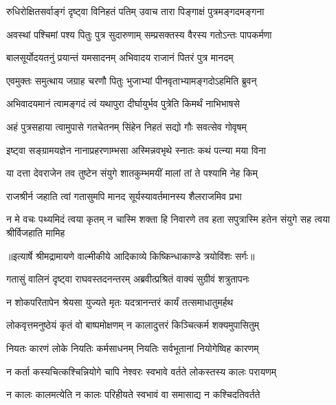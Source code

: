 \twolineshloka
{रुधिरोक्षितसर्वाङ्गं दृष्ट्वा विनिहतं पतिम्}
{उवाच तारा पिङ्गाक्षं पुत्रमङ्गदमङ्गना} %

\twolineshloka
{अवस्थां पश्चिमां पश्य पितुः पुत्र सुदारुणाम्}
{सम्प्रसक्तस्य वैरस्य गतोऽन्तः पापकर्मणा} %

\twolineshloka
{बालसूर्योदयतनुं प्रयान्तं यमसादनम्}
{अभिवादय राजानं पितरं पुत्र मानदम्} %

\twolineshloka
{एवमुक्तः समुत्थाय जग्राह चरणौ पितुः}
{भुजाभ्यां पीनवृताभ्यामङ्गदोऽहमिति ब्रुवन्} %

\twolineshloka
{अभिवादयमानं त्वामङ्गदं त्वं यथापुरा}
{दीर्घायुर्भव पुत्रेति किमर्थं नाभिभाषसे} %

\twolineshloka
{अहं पुत्रसहाया त्वामुपासे गतचेतनम्}
{सिंहेन निहतं सद्यो गौः सवत्सेव गोवृषम्} %

\twolineshloka
{इष्ट्वा सङ्ग्रामयज्ञेन नानाप्रहरणाम्भसा}
{अस्मिन्नवभृथे स्नातः कथं पत्न्या मया विना} %

\twolineshloka
{या दत्ता देवराजेन तव तुष्टेन संयुगे}
{शातकुम्भमयीं मालां तां ते पश्यामि नेह किम्} %

\twolineshloka
{राजश्रीर्न जहाति त्वां गतासुमपि मानद}
{सूर्यस्यावर्तमानस्य शैलराजमिव प्रभा} %

\fourlineindentedshloka
{न मे वचः पथ्यमिदं त्वया कृतम्}
{न चास्मि शक्ता हि निवारणे तव}
{हता सपुत्रास्मि हतेन संयुगे}
{सह त्वया श्रीर्विजहाति मामिह} %


{॥इत्यार्षे श्रीमद्रामायणे वाल्मीकीये आदिकाव्ये किष्किन्धाकाण्डे त्रयोविंशः सर्गः॥}


\twolineshloka
{गतासुं वालिनं दृष्ट्वा राघवस्तदनन्तरम्}
{अब्रवीत्प्रश्रितं वाक्यं सुग्रीवं शत्रुतापनः} %

\twolineshloka
{न शोकपरितापेन श्रेयसा युज्यते मृतः}
{यदत्रानन्तरं कार्यं तत्समाधातुमर्हथ} %

\twolineshloka
{लोकवृत्तमनुष्ठेयं कृतं वो बाष्पमोक्षणम्}
{न कालादुत्तरं किञ्चित्कर्म शक्यमुपासितुम्} %

\twolineshloka
{नियतः कारणं लोके नियतिः कर्मसाधनम्}
{नियतिः सर्वभूतानां नियोगेष्विह कारणम्} %

\twolineshloka
{न कर्ता कस्यचित्कश्चिन्नियोगे चापि नेश्वरः}
{स्वभावे वर्तते लोकस्तस्य कालः परायणम्} %

\twolineshloka
{न कालः कालमत्येति न कालः परिहीयते}
{स्वभावं वा समासाद्य न कश्चिदतिवर्तते} %


